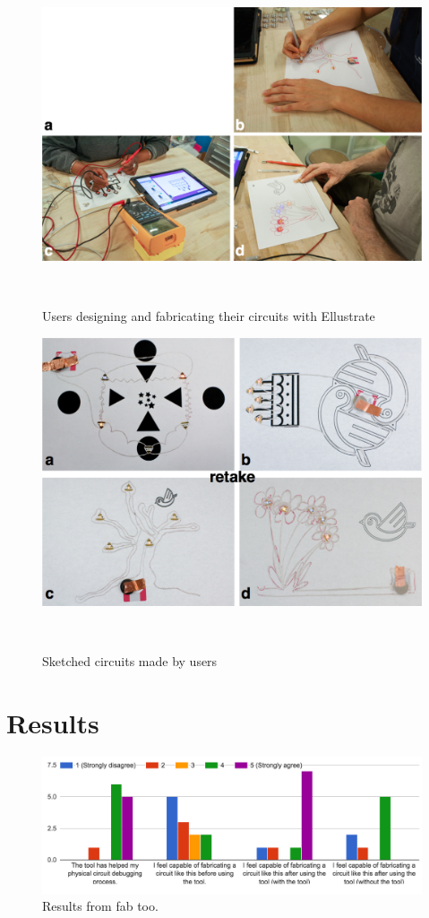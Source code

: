 \documentclass{sigchi}
\begin{document}
\begin{figure}
\centering
  \includegraphics[width=1\columnwidth]{figures/Users_in_action}
  \caption{Users designing and fabricating their circuits with Ellustrate}~\label{fig:Users_in_action}
\end{figure}


\begin{figure}
\centering
  \includegraphics[width=1\columnwidth]{figures/Users_artwork}
  \caption{Sketched circuits made by users}~\label{fig:Users_artwork}
\end{figure}

\section{Results}

\begin{figure}[t]
\centering
\includegraphics[width=1.0\columnwidth]{figures/fab_tool_results.png}
\caption{Results from fab too. }
\label{fig:fab_tool_results}
\end{figure}
\end{document}
